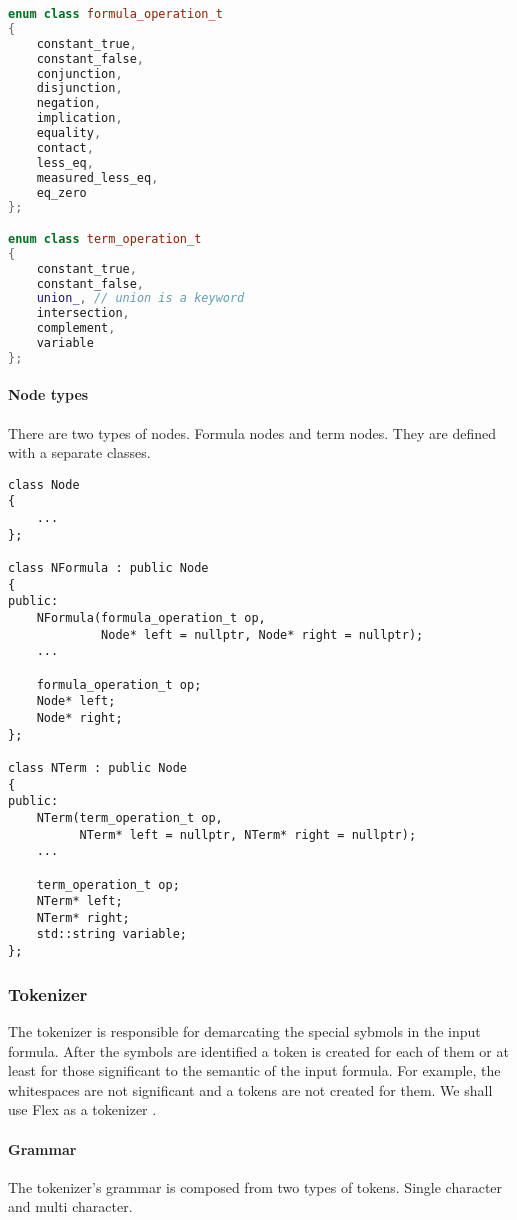 \documentclass{article}
\begin{document}
	\begin{lstlisting}[language=C++]
enum class formula_operation_t
{
    constant_true,
    constant_false,
    conjunction,
    disjunction,
    negation,
    implication,
    equality,
    contact,
    less_eq,
    measured_less_eq,
    eq_zero
};

enum class term_operation_t
{
    constant_true,
    constant_false,
    union_, // union is a keyword
    intersection,
    complement,
    variable
};
	\end{lstlisting}

	\newpage
	\paragraph{Node types} There are two types of nodes. Formula nodes and term nodes. They are defined with a separate classes.

	\begin{lstlisting}
class Node
{
    ...
};

class NFormula : public Node
{
public:
    NFormula(formula_operation_t op,
             Node* left = nullptr, Node* right = nullptr);
    ...

    formula_operation_t op;
    Node* left;
    Node* right;
};

class NTerm : public Node
{
public:
    NTerm(term_operation_t op,
          NTerm* left = nullptr, NTerm* right = nullptr);
    ...

    term_operation_t op;
    NTerm* left;
    NTerm* right;
    std::string variable;
};
	\end{lstlisting}

	\subsubsection{Tokenizer}
	The tokenizer is responsible for demarcating the special sybmols in the input formula.
	After the symbols are identified a token is created for each of them or at least for those significant to the semantic of the input formula.
	For example, the whitespaces are not significant and a tokens are not created for them.
	We shall use Flex as a tokenizer \cite{flex-tokenizer}.

	\paragraph{Grammar} The tokenizer's grammar is composed from two types of tokens. Single character and multi character.
\end{document}
